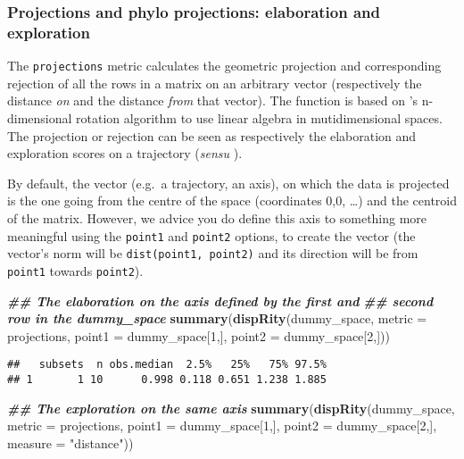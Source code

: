 \documentclass[
]{book}
\newenvironment{Shaded}{\begin{snugshade}}{\end{snugshade}}
\newcommand{\AttributeTok}[1]{\textcolor[rgb]{0.13,0.29,0.53}{#1}}
\newcommand{\DecValTok}[1]{\textcolor[rgb]{0.00,0.00,0.81}{#1}}
\newcommand{\DocumentationTok}[1]{\textcolor[rgb]{0.56,0.35,0.01}{\textbf{\textit{#1}}}}
\newcommand{\FunctionTok}[1]{\textcolor[rgb]{0.13,0.29,0.53}{\textbf{#1}}}
\newcommand{\NormalTok}[1]{#1}
\newcommand{\StringTok}[1]{\textcolor[rgb]{0.31,0.60,0.02}{#1}}
\begin{document}
\hypertarget{projections}{%
\subsubsection{Projections and phylo projections: elaboration and exploration}\label{projections}}

The \texttt{projections} metric calculates the geometric projection and corresponding rejection of all the rows in a matrix on an arbitrary vector (respectively the distance \emph{on} and the distance \emph{from} that vector). The function is based on \citet{aguilera2004}'s n-dimensional rotation algorithm to use linear algebra in mutidimensional spaces. The projection or rejection can be seen as respectively the elaboration and exploration scores on a trajectory (\emph{sensu} \citet{endler2005}).

By default, the vector (e.g.~a trajectory, an axis), on which the data is projected is the one going from the centre of the space (coordinates 0,0, \ldots) and the centroid of the matrix.
However, we advice you do define this axis to something more meaningful using the \texttt{point1} and \texttt{point2} options, to create the vector (the vector's norm will be \texttt{dist(point1,\ point2)} and its direction will be from \texttt{point1} towards \texttt{point2}).

\begin{Shaded}
\begin{Highlighting}[]
\DocumentationTok{\#\# The elaboration on the axis defined by the first and}
\DocumentationTok{\#\# second row in the dummy\_space}
\FunctionTok{summary}\NormalTok{(}\FunctionTok{dispRity}\NormalTok{(dummy\_space, }\AttributeTok{metric =}\NormalTok{ projections,}
                              \AttributeTok{point1 =}\NormalTok{ dummy\_space[}\DecValTok{1}\NormalTok{,],}
                              \AttributeTok{point2 =}\NormalTok{ dummy\_space[}\DecValTok{2}\NormalTok{,]))}
\end{Highlighting}
\end{Shaded}

\begin{verbatim}
##   subsets  n obs.median  2.5%   25%   75% 97.5%
## 1       1 10      0.998 0.118 0.651 1.238 1.885
\end{verbatim}

\begin{Shaded}
\begin{Highlighting}[]
\DocumentationTok{\#\# The exploration on the same axis}
\FunctionTok{summary}\NormalTok{(}\FunctionTok{dispRity}\NormalTok{(dummy\_space, }\AttributeTok{metric =}\NormalTok{ projections,}
                              \AttributeTok{point1 =}\NormalTok{ dummy\_space[}\DecValTok{1}\NormalTok{,],}
                              \AttributeTok{point2 =}\NormalTok{ dummy\_space[}\DecValTok{2}\NormalTok{,],}
                              \AttributeTok{measure =} \StringTok{"distance"}\NormalTok{))}
\end{Highlighting}
\end{Shaded}
\end{document}
